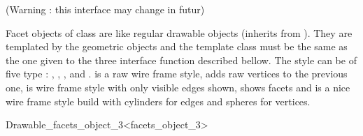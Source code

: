 
(Warning : this interface may change in futur)

Facet objects of class  are like regular
drawable objects (inherits from ). They are templated by
the geometric objects and the template class must be the same as the
one given to the three interface function described bellow. The style
can be of five type : , , ,  and .  is a raw
wire frame style,  adds raw vertices to the previous one,  is
wire frame style with only visible edges shown,  shows facets and
 is a nice wire frame style build with cylinders for edges and
spheres for vertices. 

\begin{ccClassTemplate}{Drawable_facets_object_3<facets_object_3>}
\end{ccClassTemplate}


